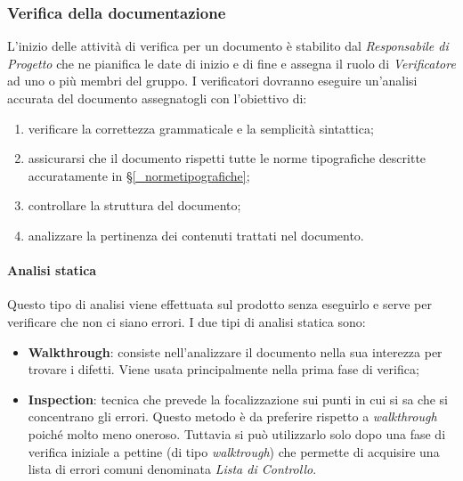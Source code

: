 \subsubsection{Verifica della documentazione}
L'inizio delle attività di verifica per un documento è stabilito dal \textit{Responsabile di Progetto} che ne pianifica le date di inizio e di fine e assegna il ruolo di \textit{Verificatore} ad uno o più membri del gruppo. I verificatori dovranno eseguire un'analisi accurata del documento assegnatogli con l'obiettivo di:
\begin{enumerate}
    \item verificare la correttezza grammaticale e la semplicità sintattica;
    \item assicurarsi che il documento rispetti tutte le norme tipografiche descritte accuratamente in \S\ref{_normetipografiche};
    \item controllare la struttura del documento;
    \item analizzare la pertinenza dei contenuti trattati nel documento.
\end{enumerate}

\paragraph{Analisi statica}
Questo tipo di analisi viene effettuata sul prodotto senza eseguirlo e serve per verificare che non ci siano errori. I due tipi di analisi statica sono:
\begin{itemize}
    \item \textbf{Walkthrough}: consiste nell'analizzare il documento nella sua interezza per trovare i difetti. Viene usata principalmente nella prima fase di verifica;
    \item \textbf{Inspection}: tecnica che prevede la focalizzazione sui punti in cui si sa che si concentrano gli errori. Questo metodo è da preferire rispetto a \textit{walkthrough} poiché molto meno oneroso. Tuttavia si può utilizzarlo solo dopo una fase di verifica iniziale a pettine (di tipo \textit{walktrough}) che permette di acquisire una lista di errori comuni denominata \textit{Lista di Controllo}.
\end{itemize}

